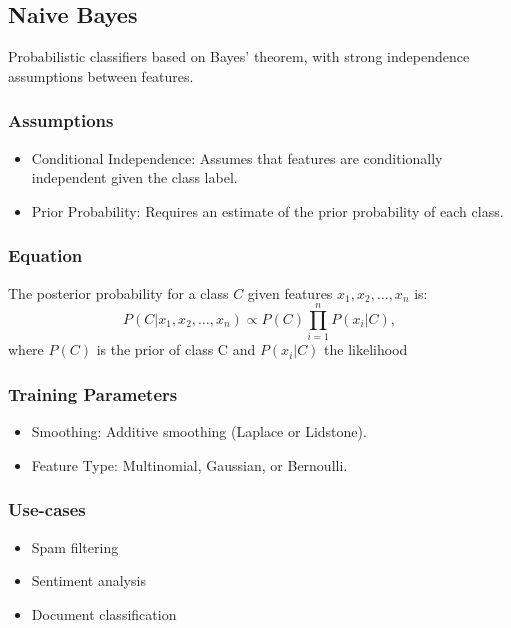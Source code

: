 \documentclass[english, threecolumn]{latex4ei/latex4ei_sheet}
\begin{document}
\begin{sectionbox}
\subsection{Naive Bayes}

Probabilistic classifiers based on Bayes' theorem, with strong independence assumptions between features.

\subsubsection{Assumptions}
\begin{itemize}
    \item Conditional Independence: Assumes that features are conditionally independent given the class label.
    \item Prior Probability: Requires an estimate of the prior probability of each class.
\end{itemize}

\subsubsection{Equation}
The posterior probability for a class \( C \) given features \( x_1, x_2, \ldots, x_n \) is:
\[
P(C|x_1, x_2, \ldots, x_n) \propto P(C) \prod_{i=1}^{n} P(x_i|C), 
\]
where $P(C)$ is the prior of class C and $P(x_i|C)$ the likelihood

\subsubsection{Training Parameters}
\begin{itemize}
    \item Smoothing: Additive smoothing (Laplace or Lidstone).
    \item Feature Type: Multinomial, Gaussian, or Bernoulli.
\end{itemize}

\subsubsection{Use-cases}
\begin{itemize}
    \item Spam filtering
    \item Sentiment analysis
    \item Document classification
\end{itemize}


\end{sectionbox}
\end{document}
